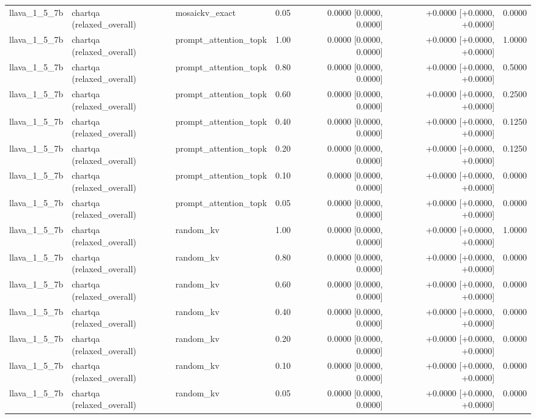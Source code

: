 \begin{longtable}{lllrrrr}
llava\_1\_5\_7b & chartqa (relaxed\_overall) & mosaickv\_exact & 0.05 & 0.0000 [0.0000, 0.0000] & +0.0000 [+0.0000, +0.0000] & 0.0000 \\
llava\_1\_5\_7b & chartqa (relaxed\_overall) & prompt\_attention\_topk & 1.00 & 0.0000 [0.0000, 0.0000] & +0.0000 [+0.0000, +0.0000] & 1.0000 \\
llava\_1\_5\_7b & chartqa (relaxed\_overall) & prompt\_attention\_topk & 0.80 & 0.0000 [0.0000, 0.0000] & +0.0000 [+0.0000, +0.0000] & 0.5000 \\
llava\_1\_5\_7b & chartqa (relaxed\_overall) & prompt\_attention\_topk & 0.60 & 0.0000 [0.0000, 0.0000] & +0.0000 [+0.0000, +0.0000] & 0.2500 \\
llava\_1\_5\_7b & chartqa (relaxed\_overall) & prompt\_attention\_topk & 0.40 & 0.0000 [0.0000, 0.0000] & +0.0000 [+0.0000, +0.0000] & 0.1250 \\
llava\_1\_5\_7b & chartqa (relaxed\_overall) & prompt\_attention\_topk & 0.20 & 0.0000 [0.0000, 0.0000] & +0.0000 [+0.0000, +0.0000] & 0.1250 \\
llava\_1\_5\_7b & chartqa (relaxed\_overall) & prompt\_attention\_topk & 0.10 & 0.0000 [0.0000, 0.0000] & +0.0000 [+0.0000, +0.0000] & 0.0000 \\
llava\_1\_5\_7b & chartqa (relaxed\_overall) & prompt\_attention\_topk & 0.05 & 0.0000 [0.0000, 0.0000] & +0.0000 [+0.0000, +0.0000] & 0.0000 \\
llava\_1\_5\_7b & chartqa (relaxed\_overall) & random\_kv & 1.00 & 0.0000 [0.0000, 0.0000] & +0.0000 [+0.0000, +0.0000] & 1.0000 \\
llava\_1\_5\_7b & chartqa (relaxed\_overall) & random\_kv & 0.80 & 0.0000 [0.0000, 0.0000] & +0.0000 [+0.0000, +0.0000] & 0.0000 \\
llava\_1\_5\_7b & chartqa (relaxed\_overall) & random\_kv & 0.60 & 0.0000 [0.0000, 0.0000] & +0.0000 [+0.0000, +0.0000] & 0.0000 \\
llava\_1\_5\_7b & chartqa (relaxed\_overall) & random\_kv & 0.40 & 0.0000 [0.0000, 0.0000] & +0.0000 [+0.0000, +0.0000] & 0.0000 \\
llava\_1\_5\_7b & chartqa (relaxed\_overall) & random\_kv & 0.20 & 0.0000 [0.0000, 0.0000] & +0.0000 [+0.0000, +0.0000] & 0.0000 \\
llava\_1\_5\_7b & chartqa (relaxed\_overall) & random\_kv & 0.10 & 0.0000 [0.0000, 0.0000] & +0.0000 [+0.0000, +0.0000] & 0.0000 \\
llava\_1\_5\_7b & chartqa (relaxed\_overall) & random\_kv & 0.05 & 0.0000 [0.0000, 0.0000] & +0.0000 [+0.0000, +0.0000] & 0.0000 \\

\end{longtable}
